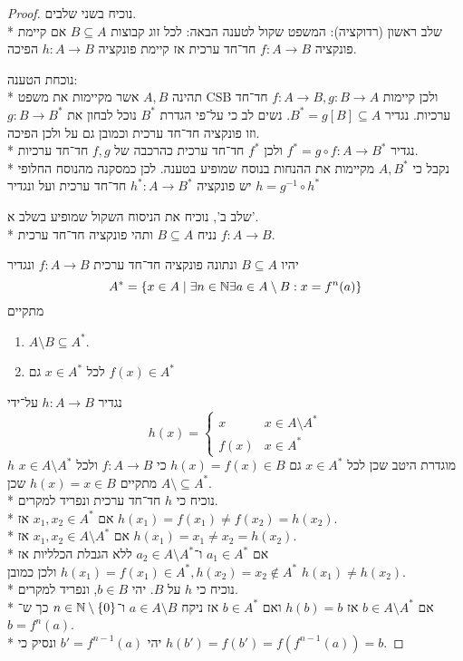 \begin{proof}
	נוכיח בשני שלבים. \\*
	שלב ראשון (רדוקציה):
	המשפט שקול לטענה הבאה: לכל זוג קבוצות $B \subseteq A$ אם קיימת פונקציה $f : A \to B$ חד־חד ערכית אז קיימת פונקציה $h : A \to B$ הפיכה.

	נוכחת הטענה: \\*
	תהינה $A, B$ אשר מקיימות את משפט CSB ולכן קיימות $f : A \to B, g : B \to A$ חד־חד ערכיות.
	נגדיר $B^* = g[B] \subseteq A$. נשים לב כי על־פי הגדרת $B^*$ נוכל לבחון את $g : B \to B^*$ וזו פונקציה חד־חד ערכית וכמובן גם על ולכן הפיכה. \\*
	נגדיר $f^* = g \circ f : A \to B^*$ ולכן $f^*$ חד־חד ערכית כהרכבה של $f, g$ חד־חד ערכיות. \\*
	נקבל כי $A, B^*$ מקיימות את ההנחות בנוסח שמופיע בטענה.
	לכן כמסקנה מהנוסח החלופי יש פונקציה $h^* : A \to B^*$ חד־חד ערכית ועל ונגדיר $h = g^{-1} \circ h^*$

	שלב ב', נוכיח את הניסוח השקול שמופיע בשלב א'. \\*
	נניח $B \subseteq A$ ותהי פונקציה חד־חד ערכית $f : A \to B$.

	יהיו $B \subseteq A$ ונתונה פונקציה חד־חד ערכית $f : A \to B$ ונגדיר
	\[
		A^* = \{ x \in A \mid \exists n \in \mathbb{N} \exists a \in A \setminus B : x = f^n(a) \}
	\]
	מתקיים
	\begin{enumerate}
		\item $A \setminus B \subseteq A^*$.
		\item לכל $x \in A^*$ גם $f(x) \in A^*$
	\end{enumerate}
	נגדיר $h : A \to B$ על־ידי
	\[
		h(x) = \begin{cases}
			x & x \in A \setminus A^* \\
			f(x) & x \in A^*
		\end{cases}
	\]
	$h$ מוגדרת היטב שכן לכל $x \in A^*$ גם $h(x) = f(x) \in B$ כי $f : A \to B$ ולכל $x \in A \setminus A^*$ מתקיים $h(x) = x \in B$ שכן $A \setminus \subseteq A^*$. \\*
	נוכיח כי $h$ חד־חד ערכית ונפריד למקרים. \\*
	אם $x_1, x_2 \in A^*$ אז $h(x_1) = f(x_1) \ne f(x_2) = h(x_2)$. \\*
	אם $x_1, x_2 \in A \setminus A^*$ אז $h(x_1) = x_1 \ne x_2 = h(x_2)$. \\*
	אם $a_1 \in A^*$ ו־$a_2 \in A \setminus A^*$ ללא הגבלת הכלליות אז $h(x_1) = f(x_1) \in A^*, h(x_2) = x_2 \notin A^*$ ולכן כמובן $h(x_1) \ne h(x_2)$. \\*
	נוכיח כי $h$ על $B$.
	יהי $b \in B$, ונפריד למקרים. \\*
	אם $b \in A\setminus A^*$ אז $h(b) = b$ ואם $b \in A^*$ אז ניקח $a \in A \setminus B$ ו־$n \in \mathbb{N}\setminus\{0\}$ כך ש־$b = f^n(a)$. \\*
	יהי $b' = f^{n - 1}(a)$ ונסיק כי $h(b') = f(b') = f(f^{n - 1}(a)) = b$.
\end{proof}

